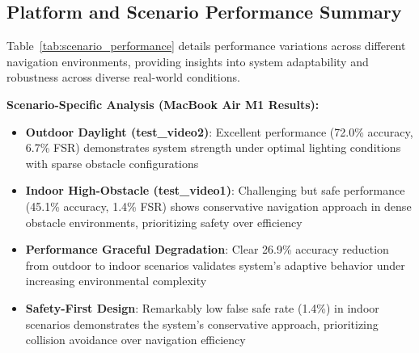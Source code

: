 \documentclass[10pt]{article}
\newcommand{\tabref}[1]{Table~\ref{#1}}
\begin{document}
\subsection{Platform and Scenario Performance Summary}

\tabref{tab:scenario_performance} details performance variations across different navigation environments, providing insights into system adaptability and robustness across diverse real-world conditions.

\begin{table}[ht]
\centering
\caption{Performance Analysis Across Navigation Scenarios}
\label{tab:scenario_performance}
\end{table}

\textbf{Scenario-Specific Analysis (MacBook Air M1 Results):}
\begin{itemize}
\item \textbf{Outdoor Daylight (test\_video2)}: Excellent performance (72.0\% accuracy, 6.7\% FSR) demonstrates system strength under optimal lighting conditions with sparse obstacle configurations
\item \textbf{Indoor High-Obstacle (test\_video1)}: Challenging but safe performance (45.1\% accuracy, 1.4\% FSR) shows conservative navigation approach in dense obstacle environments, prioritizing safety over efficiency
\item \textbf{Performance Graceful Degradation}: Clear 26.9\% accuracy reduction from outdoor to indoor scenarios validates system's adaptive behavior under increasing environmental complexity
\item \textbf{Safety-First Design}: Remarkably low false safe rate (1.4\%) in indoor scenarios demonstrates the system's conservative approach, prioritizing collision avoidance over navigation efficiency
\end{itemize}
\end{document}
